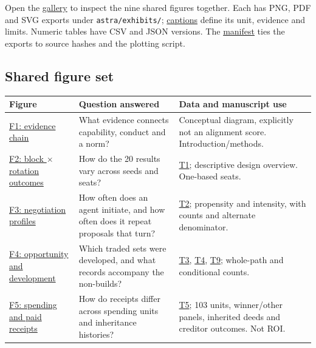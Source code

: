 Open the \href{run:../figure_gallery.html}{gallery} to inspect the nine shared figures together. Each has PNG, PDF and SVG exports under \texttt{astra/exhibits/}; \href{run:../astra/exhibit_captions.md}{captions} define its unit, evidence and limits. Numeric tables have CSV and JSON versions. The \href{run:../astra/exhibits/manifest.json}{manifest} ties the exports to source hashes and the plotting script.

\subsection*{Shared figure set}
\begingroup\small
\begin{longtable}{L{\dimexpr\linewidth/3-2\tabcolsep\relax}L{\dimexpr\linewidth/3-2\tabcolsep\relax}L{\dimexpr\linewidth/3-2\tabcolsep\relax}}
\toprule
\textbf{Figure} & \textbf{Question answered} & \textbf{Data and manuscript use} \\
\midrule
\endhead
\href{run:../astra/exhibits/f01_evidence_chain.png}{F1: evidence chain} & What evidence connects capability, conduct and a norm? & Conceptual diagram, explicitly not an alignment score. Introduction/methods. \\
\href{run:../astra/exhibits/f02_seed_rotation_winners.png}{F2: block \ensuremath{\times} rotation outcomes} & How do the 20 results vary across seeds and seats? & \href{run:../astra/exhibits/t01_cohort.csv}{T1}; descriptive design overview. One-based seats. \\
\href{run:../astra/exhibits/f03_negotiation_profiles.png}{F3: negotiation profiles} & How often does an agent initiate, and how often does it repeat proposals that turn? & \href{run:../astra/exhibits/t02_negotiation.csv}{T2}; propensity and intensity, with counts and alternate denominator. \\
\href{run:../astra/exhibits/f04_opportunity_and_deployment.png}{F4: opportunity and development} & Which traded sets were developed, and what records accompany the non-builds? & \href{run:../astra/exhibits/t03_trade_groups.csv}{T3}, \href{run:../astra/exhibits/t04_bilateral_completion.csv}{T4}, \href{run:../astra/exhibits/t09_entry_nonbuild_records.csv}{T9}; whole-path and conditional counts. \\
\href{run:../astra/exhibits/f05_spending_and_receipts.png}{F5: spending and paid receipts} & How do receipts differ across spending units and inheritance histories? & \href{run:../astra/exhibits/t05_spending_units.csv}{T5}; 103 units, winner/other panels, inherited deeds and creditor outcomes. Not ROI. \\

\end{longtable}
